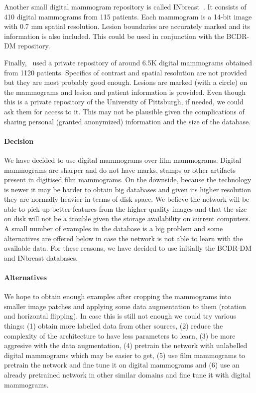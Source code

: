 	Another small digital mammogram repository is called INbreast~\cite{Moreira2012}. It consists of 410 digital mammograms from 115 patients. Each mammogram is a 14-bit image with 0.7 mm spatial resolution. Lesion boundaries are accurately marked and its information is also included. This could be used in conjunction with the BCDR-DM repository.

	Finally,~\cite{Zheng2012} used a private repository of around 6.5K digital mammograms obtained from 1120 patients. Specifics of contrast and spatial resolution are not provided but they are most probably good enough. Lesions are marked (with a circle) on the mammograms and lesion and patient information is provided. Even though this is a private repository of the University of Pittsburgh, if needed, we could ask them for access to it. This may not be plausible given the complications of sharing personal (granted anonymized) information and the size of the database.


\paragraph{Decision}
We have decided to use digital mammograms over film mammograms. Digital mammograms are sharper and do not have marks, stamps or other artifacts present in digitised film mammograms. On the downside, because the technology is newer it may be harder to obtain big databases and given its higher resolution they are normally heavier in terms of disk space. We believe the network will be able to pick up better features from the higher quality images and that the size on disk will not be a trouble given the storage availability on current computers. A small number of examples in the database is a big problem and some alternatives are offered below in case the network is not able to learn with the available data. For these reasons, we have decided to use initially the BCDR-DM and INbreast databases.

\paragraph{Alternatives}
We hope to obtain enough examples after cropping the mammograms into smaller image patches and applying some data augmentation to them (rotation and horizontal flipping). In case this is still not enough we could try various things: (1) obtain more labelled data from other sources, (2) reduce the complexity of the architecture to have less parameters to learn, (3) be more aggresive with the data augmentation, (4) pretrain the network with unlabelled digital mammograms which may be easier to get, (5) use film mammograms to pretrain the network and fine tune it on digital mammograms and (6) use an already pretrained network in other similar domains and fine tune it with digital mammograms.

